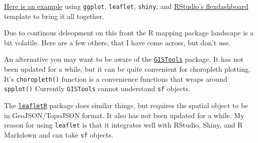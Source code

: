 \documentclass[]{book}
\theoremstyle{definition}
\theoremstyle{definition}
\theoremstyle{definition}
\theoremstyle{remark}
\begin{document}
\href{https://cengel.shinyapps.io/RioSlaveMarket/}{Here is an example}
using \texttt{ggplot}, \texttt{leaflet}, \texttt{shiny}, and
\href{http://rmarkdown.rstudio.com/flexdashboard/}{RStudio's
flexdashboard} template to bring it all together.

Due to continous deleopment on this front the R mapping package
landscape is a bit volatile. Here are a few others, that I have come
across, but don't use.

An alternative you may want to be aware of the
\href{https://CRAN.R-project.org/package=GISTools}{\texttt{GISTools}}
package. It has not been updated for a while, but it can be quite
convenient for choropleth plotting. It's \texttt{choropleth()} function
is a convenience functions that wraps around \texttt{spplot()} Currently
\texttt{GISTools} cannot understand \texttt{sf} objects.

The
\href{https://CRAN.R-project.org/package=leafletR}{\texttt{leafletR}}
package does similar things, but requires the spatial object to be in
GeoJSON/TopoJSON format. It also has not been updated for a while. My
reason for using \texttt{leaflet} is that it integrates well with
RStudio, Shiny, and R Markdown and can take \texttt{sf} objects.


\end{document}
